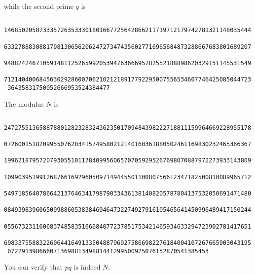 while the second prime $q$ is
{\scriptsize
\begin{Verbatim}
 1468502058733357263533301801667725642866211719712179742781321148035444
 6332788830881798130656206247273474356027716965684873288667683801689207
 9488242467105914811252659920539476366695782552188898620329151145531549
 7121404006845630292860070621021218917792295007556534607746425085044723
 36435831750052666953524384477
\end{Verbatim}
}
The modulus $N$ is
{\scriptsize
\begin{Verbatim}
 2472755136588788012823283243623501709484398222718811159964669228955178
 0726001518209955076203415749580212140160361880502461169830232465366367
 1996218795720793055101178409956065707059295267698070887972273933143809
 1099039519912687661692960509714944550110080756612347182500810089965712
 5497185640786642137646341798790334361381408205787804137532050691471480
 0849398396065099886053838469464732274927916105465641450996489417150244
 0556732311606837485835166684077237851753421465934633294723902781417651
 6983375588322606441649133504887969275866982276184004107267665903043195
 072291398666071369881349881441299500925076152870541385453
\end{Verbatim}
}
You can verify that $pq$ is indeed $N$.



\begin{comment}
s = 'aa:bb'
s = s.strip().replace('\n', '')
parts = s.split(':')
sum = 0
power = 1
for i,x in enumerate(parts[::-1]):
    sum += int(part, 16) * power
    power *= 256
\end{comment}






